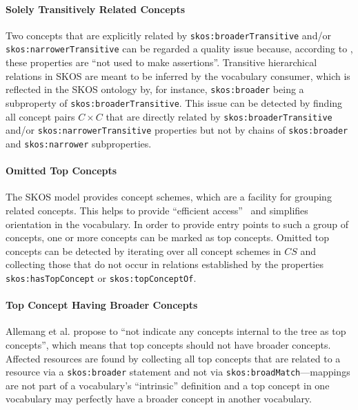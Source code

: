 {\paragraph{Solely Transitively Related Concepts}

Two concepts that are explicitly related by \texttt{skos:broaderTransitive} and/or \texttt{skos:narrowerTransitive} can be regarded a quality issue because, according to \cite{SkosReference2008}, these properties are ``not used to make assertions''. Transitive hierarchical relations in SKOS are meant to be inferred by the vocabulary consumer, which is reflected in the SKOS ontology by, for instance, \texttt{skos:broader} being a subproperty of \texttt{skos:broaderTransitive}. 
This issue can be detected by finding all concept pairs $C \times C$ that are directly related by \texttt{skos:broaderTransitive} and/or \texttt{skos:narrowerTransitive} properties but not by chains of \texttt{skos:broader} and \texttt{skos:narrower} subproperties.

\paragraph{Omitted Top Concepts}

The SKOS model provides concept schemes, which are a facility for grouping related concepts. This helps to provide ``efficient access''~\cite{Isaac2009} and simplifies orientation in the vocabulary. In order to provide entry points to such a group of concepts, one or more concepts can be marked as top concepts.  
Omitted top concepts can be detected by iterating over all concept schemes in $CS$ and collecting those that do not occur in relations established by the properties \texttt{skos:hasTopConcept} or \texttt{skos:topConceptOf}.

\paragraph{Top Concept Having Broader Concepts}

Allemang et al. \cite{Allemang2011} propose to ``not indicate any concepts internal to the tree as top concepts'', which means that top concepts should not have broader concepts. 
Affected resources are found by collecting all top concepts that are related to a resource via a \texttt{skos:broader} statement and not via \texttt{skos:broadMatch}---mappings are not part of a vocabulary's ``intrinsic'' definition and a top concept in one vocabulary may perfectly have a broader concept in another vocabulary.

}
